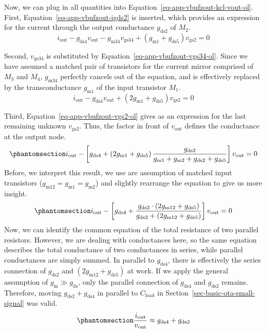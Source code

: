 \documentclass[
  a4paper,
  DIV=11,
  numbers=noendperiod]{scrartcl}
\begin{document}
Now, we can plug in all quantities into
Equation~\ref{eq-app-vbufzout-kcl-vout-ol}. First,
Equation~\ref{eq-app-vbufzout-igds2} is inserted, which provides an
expression for the current through the output conductance
\(g_\mathrm{ds2}\) of \(M_2\). \[
i_\mathrm{out} -g_\mathrm{ds4} v_\mathrm{out} - g_\mathrm{m34}v_\mathrm{gs34} + \left(g_\mathrm{m1}+g_\mathrm{ds5}\right)v_\mathrm{gs2} = 0
\]

Second, \(v_\mathrm{gs34}\) is substituted by
Equation~\ref{eq-app-vbufzout-vgs34-ol}. Since we have assumed a matched
pair of transistors for the current mirror comprised of \(M_3\) and
\(M_4\), \(g_\mathrm{m34}\) perfectly cancels out of the equation, and
is effectively replaced by the transconductance \(g_\mathrm{m1}\) of the
input transistor \(M_1\). \[
i_\mathrm{out} -g_\mathrm{ds4} v_\mathrm{out} + \left(2g_\mathrm{m1}+g_\mathrm{ds5}\right)v_\mathrm{gs2} = 0
\]

Third, Equation~\ref{eq-app-vbufzout-vgs2-ol} gives as an expression for
the last remaining unknown \(v_\mathrm{gs2}\). Thus, the factor in front
of \(v_\mathrm{out}\) defines the conductance at the output node.
\begin{equation}\phantomsection\label{eq-app-vbufzout-zout-ol-1}{
i_\mathrm{out} -\left[g_\mathrm{ds4} + \left(2g_\mathrm{m1}+g_\mathrm{ds5}\right)\frac{g_\mathrm{ds2}}{g_\mathrm{m1}+g_\mathrm{m2}+g_\mathrm{ds2}+g_\mathrm{ds5}}\right]v_\mathrm{out} = 0
}\end{equation} Before, we interpret this result, we use are assumption
of matched input transistors
(\(g_\mathrm{m12}=g_\mathrm{m1}=g_\mathrm{m2}\)) and slightly rearrange
the equation to give us more insight.
\begin{equation}\phantomsection\label{eq-app-vbufzout-zout-ol-2}{
i_\mathrm{out} -\left[g_\mathrm{ds4} + \frac{g_\mathrm{ds2}\cdot\left(2g_\mathrm{m12}+g_\mathrm{ds5}\right)}{g_\mathrm{ds2}+\left(2g_\mathrm{m12}+g_\mathrm{ds5}\right)}\right]v_\mathrm{out} = 0
}\end{equation} Now, we can identify the common equation of the total
resistance of two parallel resistors. However, we are dealing with
conductances here, so the same equation describes the total conductance
of two conductances in series, while parallel conductances are simply
summed. In parallel to \(g_\mathrm{ds4}\), there is effectively the
series connection of \(g_\mathrm{ds2}\) and
\(\left(2g_\mathrm{m12}+g_\mathrm{ds5}\right)\) at work. If we apply the
general assumption of \(g_\mathrm{m}\gg g_\mathrm{ds}\), only the
parallel connection of \(g_\mathrm{ds4}\) and \(g_\mathrm{ds2}\)
remains. Therefore, moving \(g_\mathrm{ds2} + g_\mathrm{ds4}\) in
parallel to \(C_\mathrm{load}\) in
Section~\ref{sec-basic-ota-small-signal} was valid.
\begin{equation}\phantomsection\label{eq-app-vbufzout-zout-ol-3}{
\frac{i_\mathrm{out}}{v_\mathrm{out}}\approx g_\mathrm{ds4} + g_\mathrm{ds2}
}\end{equation}
\end{document}
